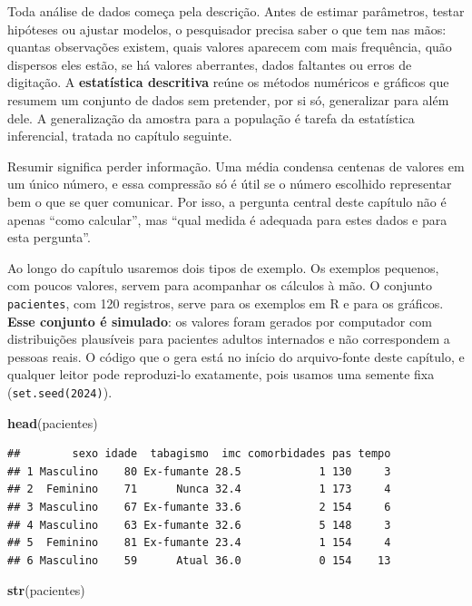 \documentclass[
]{book}
\newenvironment{Shaded}{\begin{snugshade}}{\end{snugshade}}
\newcommand{\FunctionTok}[1]{\textcolor[rgb]{0.13,0.29,0.53}{\textbf{#1}}}
\newcommand{\NormalTok}[1]{#1}
\begin{document}
Toda análise de dados começa pela descrição. Antes de estimar parâmetros, testar hipóteses ou ajustar modelos, o pesquisador precisa saber o que tem nas mãos: quantas observações existem, quais valores aparecem com mais frequência, quão dispersos eles estão, se há valores aberrantes, dados faltantes ou erros de digitação. A \textbf{estatística descritiva} reúne os métodos numéricos e gráficos que resumem um conjunto de dados sem pretender, por si só, generalizar para além dele. A generalização da amostra para a população é tarefa da estatística inferencial, tratada no capítulo seguinte.

Resumir significa perder informação. Uma média condensa centenas de valores em um único número, e essa compressão só é útil se o número escolhido representar bem o que se quer comunicar. Por isso, a pergunta central deste capítulo não é apenas ``como calcular'', mas ``qual medida é adequada para estes dados e para esta pergunta''.

Ao longo do capítulo usaremos dois tipos de exemplo. Os exemplos pequenos, com poucos valores, servem para acompanhar os cálculos à mão. O conjunto \texttt{pacientes}, com 120 registros, serve para os exemplos em R e para os gráficos. \textbf{Esse conjunto é simulado}: os valores foram gerados por computador com distribuições plausíveis para pacientes adultos internados e não correspondem a pessoas reais. O código que o gera está no início do arquivo-fonte deste capítulo, e qualquer leitor pode reproduzi-lo exatamente, pois usamos uma semente fixa (\texttt{set.seed(2024)}).

\begin{Shaded}
\begin{Highlighting}[]
\FunctionTok{head}\NormalTok{(pacientes)}
\end{Highlighting}
\end{Shaded}

\begin{verbatim}
##        sexo idade  tabagismo  imc comorbidades pas tempo
## 1 Masculino    80 Ex-fumante 28.5            1 130     3
## 2  Feminino    71      Nunca 32.4            1 173     4
## 3 Masculino    67 Ex-fumante 33.6            2 154     6
## 4 Masculino    63 Ex-fumante 32.6            5 148     3
## 5  Feminino    81 Ex-fumante 23.4            1 154     4
## 6 Masculino    59      Atual 36.0            0 154    13
\end{verbatim}

\begin{Shaded}
\begin{Highlighting}[]
\FunctionTok{str}\NormalTok{(pacientes)}
\end{Highlighting}
\end{Shaded}
\end{document}
